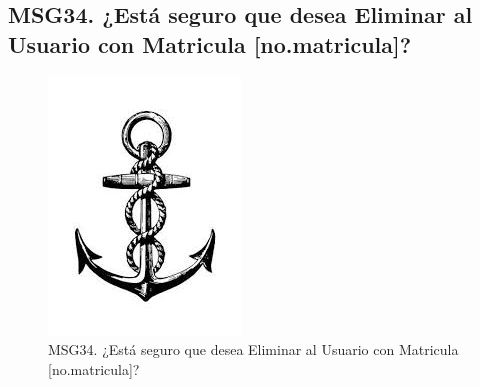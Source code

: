     \subsection{MSG34. ¿Está seguro que desea Eliminar al Usuario con Matricula [no.matricula]?}
        \begin{figure}[htbp]
            \begin{center}
                \includegraphics[width=.4\textwidth]{images/MSG/ancla}
                \caption{MSG34. ¿Está seguro que desea Eliminar al Usuario con Matricula [no.matricula]?}
                \label{fig:MSG34}
            \end{center}
        \end{figure}




